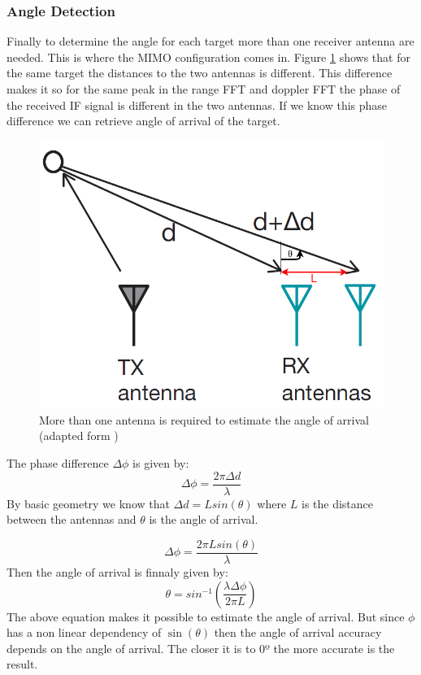 \subsubsection{Angle Detection}
Finally to determine the angle for each target more than one receiver antenna are needed. This is where the \ac{MIMO} configuration comes in. Figure \ref{fig:angle} shows that for the same target the distances to the two antennas is different.  This difference makes it so for the same peak in the range \ac{FFT} and doppler \ac{FFT} the phase of the received \ac{IF} signal is different in the two antennas. If we know this phase difference we can retrieve angle of arrival of the target. 
\begin{figure}[ht] 
\centerline{\includegraphics [width=0.5 \textwidth]{imgs/chapter2/angle2.png}}
\caption[Angle of arrival estimation using more than one antenna]{More than one antenna is required to estimate the angle of arrival (adapted form \cite{iovescu2017fundamentals})}
\label{fig:angle}
\end{figure}
The phase difference $\Delta \phi$ is given by:
\begin{equation}
    \Delta \phi=\frac{2 \pi \Delta d}{\lambda}
\end{equation}
By basic geometry we know that $\Delta d =L sin(\theta)$ where $L$ is the distance between the antennas and $\theta$ is the angle of arrival. 

\begin{equation}
    \Delta \phi=\frac{2 \pi L sin(\theta)}{\lambda}
\end{equation}
Then the angle of arrival is finnaly given by:
\begin{equation}
    \theta = sin^{-1}(\frac{\lambda \Delta \phi}{2 \pi L})
\end{equation}
The above equation makes it possible to estimate the angle of arrival. But since $\phi$ has a non linear dependency of $\sin(\theta)$ then the angle of arrival accuracy depends on the angle of arrival. The closer it is to 0º the more accurate is the result.

